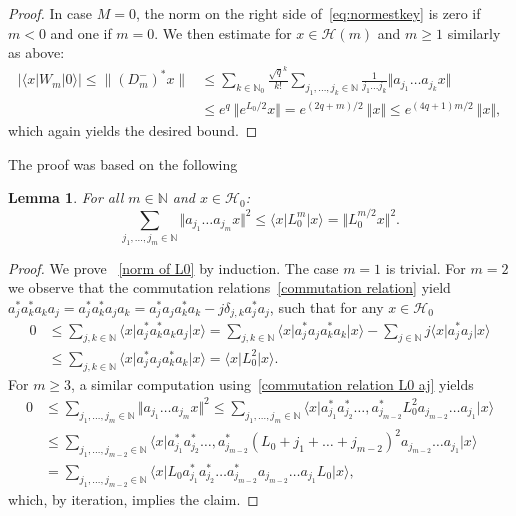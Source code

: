 \documentclass[letterpaper, DIV=17]{scrartcl}
\newtheorem{lemma}[theorem]{Lemma}
\numberwithin{equation}{section}
\theoremstyle{definition}
\begin{document}
\begin{proof}
		In case $ M = 0 $,  the norm on the right side of~\eqref{eq:normestkey} is zero if $ m < 0 $ and one if $ m = 0 $. We then estimate for $ x \in  \mathcal{H}(m) $ and $ m \geq 1 $ similarly as above:
				\begin{align*}
					 \vert \langle x |  W_m  | 0 \rangle \vert \leq  \| (D_m^-)^*  x \|  & \leq \sum_{k\in \mathbb{N}_0} \frac{\sqrt{q}^k}{k!} \sum_{j_1, \dots, j_k\in \mathbb{N}} \frac{1}{j_1 \dots j_k} \Vert a_{j_1} \dots a_{j_k} x\Vert \\
					 & \leq e^{q} \  \Vert e^{L_0/2} x \Vert = e^{(2q +m)/2} \  \Vert x \Vert \leq e^{(4q +1) m /2}  \ \Vert x \Vert ,
				\end{align*}
				which again yields the desired bound. 
			\end{proof}
		The proof was based on the following
	\begin{lemma}\label{lem:simplebound}
			For all $m\in \mathbb{N}$ and $ x \in \mathcal{H}_0 $:
			\begin{equation} \label{norm of L0}
				\sum_{j_1, \dots, j_m \in \mathbb{N}} \Vert a_{j_1} \dots a_{j_m} x \Vert^2 
				\leq \langle x\vert L_0^m \vert x\rangle = \Vert L_0^{m/2} x \Vert^2.
			\end{equation}
		\end{lemma}
		\begin{proof}
			 We prove	~\eqref{norm of L0} by induction. The case $m=1$ is trivial. For $m=2$ we observe that the commutation relations~\eqref{commutation relation} yield
			$a_j^* a_k^* a_k a_j = a_j^* a_k^* a_j a_k
				= a_j^* a_j a_k^* a_k - j \delta_{j,k} a_j^* a_j $, such that 
			 for any $x\in \mathcal{H}_0$
			\begin{align*}
				0 &
				\leq \sum_{j, k \in \mathbb{N}} \langle x\vert  a_j^* a_k^* a_k a_j \vert x \rangle
				= \sum_{j, k \in \mathbb{N}} \langle x \vert a_j^* a_j a_k^* a_k \vert x \rangle - \sum_{j \in \mathbb{N}} j \langle x\vert a_j^* a_j \vert x \rangle \\
				&\leq  \sum_{j, k \in \mathbb{N}} \langle x\vert a_j^* a_j a_k^* a_k \vert x \rangle 
				= \langle x\vert L_0^2 \vert x \rangle. 
			\end{align*}
			For $m\geq 3$, a similar computation using~\eqref{commutation relation L0 aj} yields
			\begin{align*}
				0& \leq \sum_{j_1, \dots, j_m \in \mathbb{N}} \Vert a_{j_1} \dots a_{j_m} x \Vert^2 
				\leq \sum_{j_1, \dots, j_m \in \mathbb{N}} \langle x\vert  a_{j_1}^* a_{j_2}^* \dots, a_{j_{m-2}}^* L_0^2 a_{j_{m-2}} \dots a_{j_1} \vert x \rangle \\
				&\leq \sum_{j_1, \dots, j_{m-2} \in \mathbb{N}} \langle x\vert  a_{j_1}^* a_{j_2}^* \dots, a_{j_{m-2}}^* (L_0+j_1+\dots + j_{m-2})^2 a_{j_{m-2}} \dots a_{j_1} \vert x \rangle \\
				&= \sum_{j_1, \dots, j_{m-2} \in \mathbb{N}} \langle  x\vert L_0 a_{j_1}^* a_{j_2}^* \dots a_{j_{m-2}}^* a_{j_{m-2}} \dots a_{j_1}  L_0  \vert x \rangle,
			\end{align*}
			which, by iteration, implies the claim.
		\end{proof}
		
\end{document}
